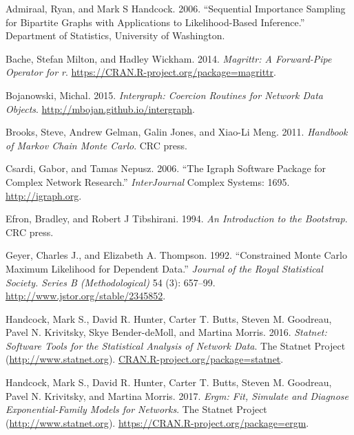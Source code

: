 \documentclass[
]{book}
\newlength{\cslhangindent}
\newlength{\cslentryspacingunit} %
\newenvironment{CSLReferences}[2] %
 {%
  \setlength{\parindent}{0pt}
  \ifodd #1
  \let\oldpar\par
  \def\par{\hangindent=\cslhangindent\oldpar}
  \fi
  \setlength{\parskip}{#2\cslentryspacingunit}
 }%
 {}
\begin{document}
\hypertarget{refs}{}
\begin{CSLReferences}{1}{0}
\leavevmode{}%
Admiraal, Ryan, and Mark S Handcock. 2006. {``Sequential Importance Sampling for Bipartite Graphs with Applications to Likelihood-Based Inference.''} Department of Statistics, University of Washington.

\leavevmode{}%
Bache, Stefan Milton, and Hadley Wickham. 2014. \emph{Magrittr: A Forward-Pipe Operator for r}. \url{https://CRAN.R-project.org/package=magrittr}.

\leavevmode{}%
Bojanowski, Michal. 2015. \emph{Intergraph: Coercion Routines for Network Data Objects}. \url{http://mbojan.github.io/intergraph}.

\leavevmode{}%
Brooks, Steve, Andrew Gelman, Galin Jones, and Xiao-Li Meng. 2011. \emph{Handbook of Markov Chain Monte Carlo}. CRC press.

\leavevmode{}%
Csardi, Gabor, and Tamas Nepusz. 2006. {``The Igraph Software Package for Complex Network Research.''} \emph{InterJournal} Complex Systems: 1695. \url{http://igraph.org}.

\leavevmode{}%
Efron, Bradley, and Robert J Tibshirani. 1994. \emph{An Introduction to the Bootstrap}. CRC press.

\leavevmode{}%
Geyer, Charles J., and Elizabeth A. Thompson. 1992. {``Constrained Monte Carlo Maximum Likelihood for Dependent Data.''} \emph{Journal of the Royal Statistical Society. Series B (Methodological)} 54 (3): 657--99. \url{http://www.jstor.org/stable/2345852}.

\leavevmode{}%
Handcock, Mark S., David R. Hunter, Carter T. Butts, Steven M. Goodreau, Pavel N. Krivitsky, Skye Bender-deMoll, and Martina Morris. 2016. \emph{Statnet: Software Tools for the Statistical Analysis of Network Data}. The Statnet Project (\url{http://www.statnet.org}). \href{https://CRAN.R-project.org/package=statnet}{CRAN.R-project.org/package=statnet}.

\leavevmode{}%
Handcock, Mark S., David R. Hunter, Carter T. Butts, Steven M. Goodreau, Pavel N. Krivitsky, and Martina Morris. 2017. \emph{Ergm: Fit, Simulate and Diagnose Exponential-Family Models for Networks}. The Statnet Project (\url{http://www.statnet.org}). \url{https://CRAN.R-project.org/package=ergm}.


\end{CSLReferences}
\end{document}

